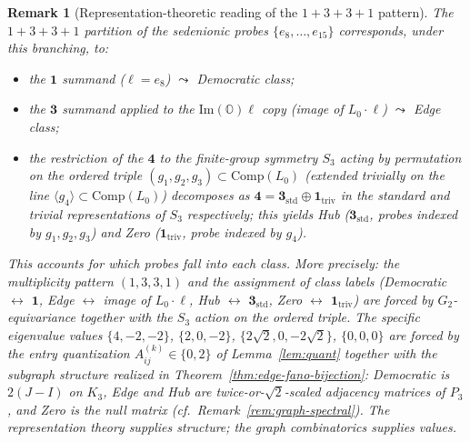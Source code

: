 \documentclass[12pt,a4paper]{article}
\newtheorem{remark}[theorem]{Remark}
\begin{document}
\begin{remark}[Representation-theoretic reading of the $1+3+3+1$ pattern]
The $1+3+3+1$ partition of the sedenionic probes $\{e_8, \ldots, e_{15}\}$ corresponds, under this branching, to:
\begin{itemize}
  \item the $\mathbf{1}$ summand ($\ell = e_8$) $\leadsto$ \emph{Democratic} class;
  \item the $\mathbf{3}$ summand applied to the $\mathrm{Im}(\mathbb{O})\ell$ copy (image of $L_0 \cdot \ell$) $\leadsto$ \emph{Edge} class;
  \item the restriction of the $\mathbf{4}$ to the finite-group symmetry $S_3$ acting by permutation on the ordered triple $(g_1, g_2, g_3) \subset \mathrm{Comp}(L_0)$ (extended trivially on the line $\langle g_4 \rangle \subset \mathrm{Comp}(L_0)$) decomposes as $\mathbf{4} = \mathbf{3}_{\mathrm{std}} \oplus \mathbf{1}_{\mathrm{triv}}$ in the standard and trivial representations of $S_3$ respectively; this yields \emph{Hub} ($\mathbf{3}_{\mathrm{std}}$, probes indexed by $g_1, g_2, g_3$) and \emph{Zero} ($\mathbf{1}_{\mathrm{triv}}$, probe indexed by $g_4$).
\end{itemize}
This accounts for \emph{which} probes fall into each class. More precisely: the multiplicity pattern $(1, 3, 3, 1)$ and the assignment of class labels (Democratic $\leftrightarrow$ $\mathbf{1}$, Edge $\leftrightarrow$ image of $L_0 \cdot \ell$, Hub $\leftrightarrow$ $\mathbf{3}_{\mathrm{std}}$, Zero $\leftrightarrow$ $\mathbf{1}_{\mathrm{triv}}$) are forced by $G_2$-equivariance together with the $S_3$ action on the ordered triple. The \emph{specific eigenvalue values} $\{4, -2, -2\}$, $\{2, 0, -2\}$, $\{2\sqrt{2}, 0, -2\sqrt{2}\}$, $\{0, 0, 0\}$ are forced by the entry quantization $A^{(k)}_{ij} \in \{0, 2\}$ of Lemma~\ref{lem:quant} together with the subgraph structure realized in Theorem~\ref{thm:edge-fano-bijection}: Democratic is $2(J - I)$ on $K_3$, Edge and Hub are twice-or-$\sqrt{2}$-scaled adjacency matrices of $P_3$, and Zero is the null matrix (cf.\ Remark~\ref{rem:graph-spectral}). The representation theory supplies structure; the graph combinatorics supplies values.
\end{remark}
\end{document}
